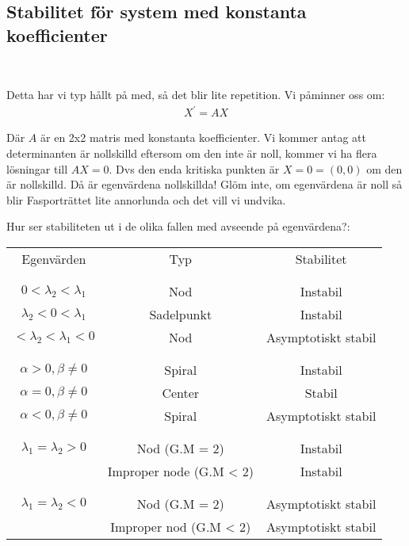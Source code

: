 \subsection{Stabilitet för system med konstanta koefficienter}\hfill\\
\par\bigskip
\noindent Detta har vi typ hållt på med, så det blir lite repetition. Vi påminner oss om:
\begin{equation*}
  \begin{gathered}
    X^{\prime} = AX
  \end{gathered}
\end{equation*}\par
\noindent Där $A$ är en 2x2 matris med konstanta koefficienter. Vi kommer antag att determinanten är nollskilld eftersom om den inte är noll, kommer vi ha flera lösningar till $AX = 0$. Dvs den enda kritiska punkten är $X = 0 = (0,0)$ om den är nollskilld. Då är egenvärdena nollskillda! Glöm inte, om egenvärdena är noll så blir Fasporträttet lite annorlunda och det vill vi undvika. 
\par\bigskip
\noindent Hur ser stabiliteten ut i de olika fallen med avseende på egenvärdena?:
\par\bigskip
\begin{center}
  \begin{tabular}{c|c|c}
    Egenvärden&Typ&Stabilitet\\\\
    \hline\\
    $0<\lambda_2<\lambda_1$&Nod&Instabil\\
    $\lambda_2<0<\lambda_1$&Sadelpunkt&Instabil\\
    $<\lambda_2<\lambda_1<0$&Nod&Asymptotiskt stabil\\\\
    \hline\\
    $\alpha>0, \beta\neq0$&Spiral&Instabil\\
    $\alpha=0, \beta\neq0$&Center&Stabil\\
    $\alpha<0, \beta\neq0$&Spiral&Asymptotiskt stabil\\\\
    \hline\\
    $\lambda_1=\lambda_2 > 0$&Nod (G.M = 2)&Instabil\\
    &Improper node (G.M < 2)&Instabil\\\\
    \hline\\
    $\lambda_1=\lambda_2<0$&Nod (G.M = 2)&Asymptotiskt stabil\\
    &Improper nod (G.M < 2)&Asymptotiskt stabil\\
  \end{tabular}
\end{center}
